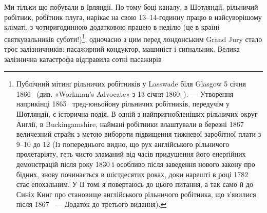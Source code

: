 Ми тільки що побували в Ірляндії. По тому боці каналу, в
Шотляндії, рільничий робітник, робітник плуга, нарікає на свою
13--14-годинну працю в найсуворішому кліматі, з чотиригодинною
додатковою працею в неділю (це в країні святкувальників
суботи!)\footnote{
Публічний мітинґ рільничих робітників у Lasswade біля Glasgow
5 січня 1866~ (див. «Workman’s Advocate» з 13 січня 1860~). — Утворення
наприкінці 1865~ тред-юньойону рільничих робітників, передучім
у Шотляндії, є історична подія. В одній з найпригнобленіших рільничих
округ Англії, в Buckingamshire, наймані робітники влаштували
в березні 1867~ величезний страйк з метою вибороти підвищення тижневої
заробітної плати з 9--10 до 12 (Із попереднього
видно, що рух англійського рільничого пролетаріяту, геть чисто зламаний
від часів придушення його енерґійних демонстрацій після року 1830
і особливо після заведення нового закону про бідних, знову починається
в шістдесятих роках, доки нарешті в році 1782 стає епохальним. У ІІ томі
я повертаюсь до цього питання, а так само й до Синіх Книг про становище
англійського рільничого робітника, що з’явилися після 1867~ — Додаток
до третього видання).
}, одночасно з цим перед лондонським Grand Jury стало
троє залізничників: пасажирний кондуктор, машиніст і сиґнальник.
Велика залізнична катастрофа відправила сотні пасажирів
\parbreak{}  %
